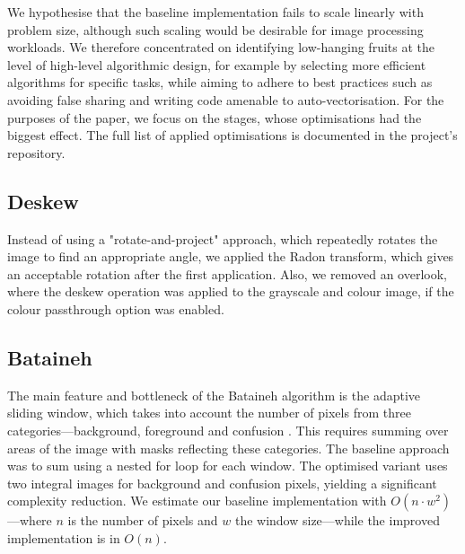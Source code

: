\documentclass[sigconf]{acmart}
\begin{document}
We hypothesise that the baseline implementation fails to scale linearly with problem size, although such scaling would be desirable for image processing workloads. We therefore concentrated on identifying low-hanging fruits at the level of high-level algorithmic design, for example by selecting more efficient algorithms for specific tasks, while aiming to adhere to best practices such as avoiding false sharing and writing code amenable to auto-vectorisation. For the purposes of the paper, we focus on the stages, whose optimisations had the biggest effect. The full list of applied optimisations is documented in the project's repository. %

\subsection{Deskew}
Instead of using a "rotate-and-project" approach, which repeatedly rotates the image to find an appropriate angle, we applied the Radon transform, which gives an acceptable rotation after the first application. Also, we removed an overlook, where the deskew operation was applied to the grayscale and colour image, if the colour passthrough option was enabled.  %

\subsection{Bataineh}
The main feature and bottleneck of the Bataineh algorithm is the adaptive sliding window, which takes into account the number of pixels from three categories---background, foreground and confusion \cite{adaptive_thresholding_methods_bataineh_2011}. This requires summing over areas of the image with masks reflecting these categories. The baseline approach was to sum using a nested for loop for each window. The optimised variant uses two integral images for background and confusion pixels, yielding a significant complexity reduction. We estimate our baseline implementation with $O(n \cdot w^2)$---where $n$ is the number of pixels and $w$ the window size---while the improved implementation is in $O(n)$.

\end{document}
